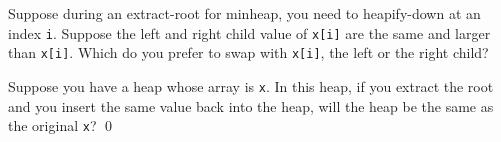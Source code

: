 \begin{ex}
  Suppose during an extract-root for minheap,
  you need to heapify-down at an index \verb!i!.
  Suppose the left and right child value of \verb!x[i]! are the same and
  larger than \verb!x[i]!.
  Which do you prefer to swap with \verb!x[i]!, the left or the right
  child?
\end{ex}
%

\begin{ex}
  Suppose you have a heap whose array is \verb!x!.
  In this heap, if you extract the root and you insert the same value back
  into the heap, will the heap be the same as the original \verb!x!?
  \qed
\end{ex}
%
%
%
